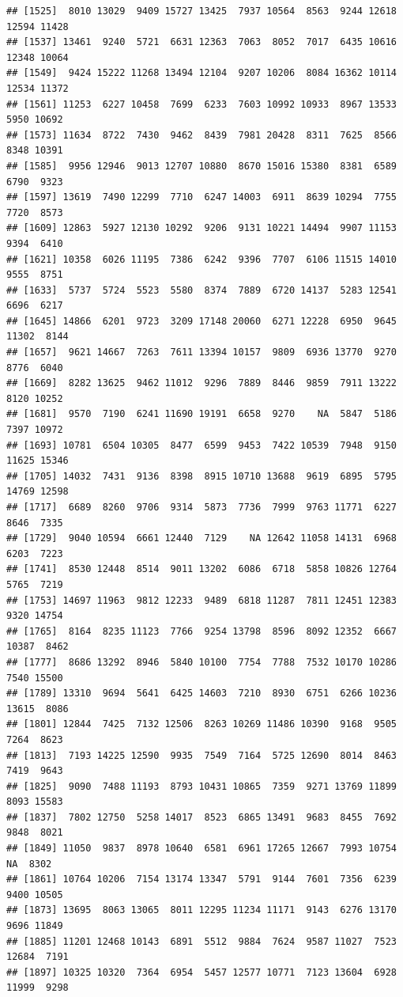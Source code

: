 \documentclass[
]{article}
\begin{document}
\begin{verbatim}
## [1525]  8010 13029  9409 15727 13425  7937 10564  8563  9244 12618 12594 11428
## [1537] 13461  9240  5721  6631 12363  7063  8052  7017  6435 10616 12348 10064
## [1549]  9424 15222 11268 13494 12104  9207 10206  8084 16362 10114 12534 11372
## [1561] 11253  6227 10458  7699  6233  7603 10992 10933  8967 13533  5950 10692
## [1573] 11634  8722  7430  9462  8439  7981 20428  8311  7625  8566  8348 10391
## [1585]  9956 12946  9013 12707 10880  8670 15016 15380  8381  6589  6790  9323
## [1597] 13619  7490 12299  7710  6247 14003  6911  8639 10294  7755  7720  8573
## [1609] 12863  5927 12130 10292  9206  9131 10221 14494  9907 11153  9394  6410
## [1621] 10358  6026 11195  7386  6242  9396  7707  6106 11515 14010  9555  8751
## [1633]  5737  5724  5523  5580  8374  7889  6720 14137  5283 12541  6696  6217
## [1645] 14866  6201  9723  3209 17148 20060  6271 12228  6950  9645 11302  8144
## [1657]  9621 14667  7263  7611 13394 10157  9809  6936 13770  9270  8776  6040
## [1669]  8282 13625  9462 11012  9296  7889  8446  9859  7911 13222  8120 10252
## [1681]  9570  7190  6241 11690 19191  6658  9270    NA  5847  5186  7397 10972
## [1693] 10781  6504 10305  8477  6599  9453  7422 10539  7948  9150 11625 15346
## [1705] 14032  7431  9136  8398  8915 10710 13688  9619  6895  5795 14769 12598
## [1717]  6689  8260  9706  9314  5873  7736  7999  9763 11771  6227  8646  7335
## [1729]  9040 10594  6661 12440  7129    NA 12642 11058 14131  6968  6203  7223
## [1741]  8530 12448  8514  9011 13202  6086  6718  5858 10826 12764  5765  7219
## [1753] 14697 11963  9812 12233  9489  6818 11287  7811 12451 12383  9320 14754
## [1765]  8164  8235 11123  7766  9254 13798  8596  8092 12352  6667 10387  8462
## [1777]  8686 13292  8946  5840 10100  7754  7788  7532 10170 10286  7540 15500
## [1789] 13310  9694  5641  6425 14603  7210  8930  6751  6266 10236 13615  8086
## [1801] 12844  7425  7132 12506  8263 10269 11486 10390  9168  9505  7264  8623
## [1813]  7193 14225 12590  9935  7549  7164  5725 12690  8014  8463  7419  9643
## [1825]  9090  7488 11193  8793 10431 10865  7359  9271 13769 11899  8093 15583
## [1837]  7802 12750  5258 14017  8523  6865 13491  9683  8455  7692  9848  8021
## [1849] 11050  9837  8978 10640  6581  6961 17265 12667  7993 10754    NA  8302
## [1861] 10764 10206  7154 13174 13347  5791  9144  7601  7356  6239  9400 10505
## [1873] 13695  8063 13065  8011 12295 11234 11171  9143  6276 13170  9696 11849
## [1885] 11201 12468 10143  6891  5512  9884  7624  9587 11027  7523 12684  7191
## [1897] 10325 10320  7364  6954  5457 12577 10771  7123 13604  6928 11999  9298

\end{verbatim}
\end{document}
